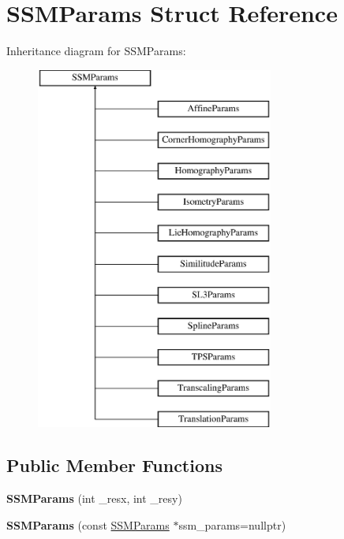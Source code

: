 \hypertarget{structSSMParams}{\section{S\-S\-M\-Params Struct Reference}
\label{structSSMParams}
}
Inheritance diagram for S\-S\-M\-Params\-:\begin{figure}[H]
\begin{center}
\leavevmode
\includegraphics[height=12.000000cm]{structSSMParams}
\end{center}
\end{figure}
\subsection*{Public Member Functions}
\begin{DoxyCompactItemize}
\item 
\hypertarget{structSSMParams_a33602ed0a0a51657420355b7f3f1df9a}{{\bfseries S\-S\-M\-Params} (int \-\_\-resx, int \-\_\-resy)}\label{structSSMParams_a33602ed0a0a51657420355b7f3f1df9a}

\item 
\hypertarget{structSSMParams_a8d7cae8ee0a96f2e62f25f6548b142d3}{{\bfseries S\-S\-M\-Params} (const \hyperlink{structSSMParams}{S\-S\-M\-Params} $\ast$ssm\-\_\-params=nullptr)}\label{structSSMParams_a8d7cae8ee0a96f2e62f25f6548b142d3}

\end{DoxyCompactItemize}
